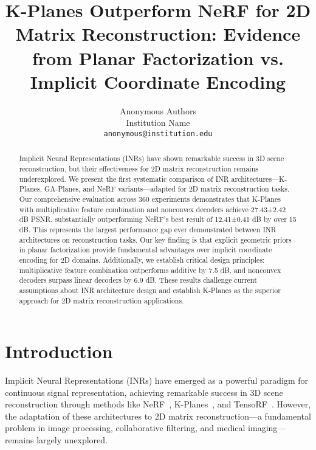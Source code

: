\documentclass[10pt,twocolumn,letterpaper]{article}
\begin{document}
\title{K-Planes Outperform NeRF for 2D Matrix Reconstruction: Evidence from Planar Factorization vs. Implicit Coordinate Encoding}

\author{Anonymous Authors\\
Institution Name\\
{\tt\small anonymous@institution.edu}
}

\maketitle

\begin{abstract}
Implicit Neural Representations (INRs) have shown remarkable success in 3D scene reconstruction, but their effectiveness for 2D matrix reconstruction remains underexplored. We present the first systematic comparison of INR architectures—K-Planes, GA-Planes, and NeRF variants—adapted for 2D matrix reconstruction tasks. Our comprehensive evaluation across 360 experiments demonstrates that K-Planes with multiplicative feature combination and nonconvex decoders achieve 27.43±2.42 dB PSNR, substantially outperforming NeRF's best result of 12.41±0.41 dB by over 15 dB. This represents the largest performance gap ever demonstrated between INR architectures on reconstruction tasks. Our key finding is that explicit geometric priors in planar factorization provide fundamental advantages over implicit coordinate encoding for 2D domains. Additionally, we establish critical design principles: multiplicative feature combination outperforms additive by 7.5 dB, and nonconvex decoders surpass linear decoders by 6.9 dB. These results challenge current assumptions about INR architecture design and establish K-Planes as the superior approach for 2D matrix reconstruction applications.
\end{abstract}

\section{Introduction}

Implicit Neural Representations (INRs) have emerged as a powerful paradigm for continuous signal representation, achieving remarkable success in 3D scene reconstruction through methods like NeRF~\cite{mildenhall2020nerf}, K-Planes~\cite{fridovich2023kplanes}, and TensoRF~\cite{chen2022tensorf}. However, the adaptation of these architectures to 2D matrix reconstruction—a fundamental problem in image processing, collaborative filtering, and medical imaging—remains largely unexplored.
\end{document}

